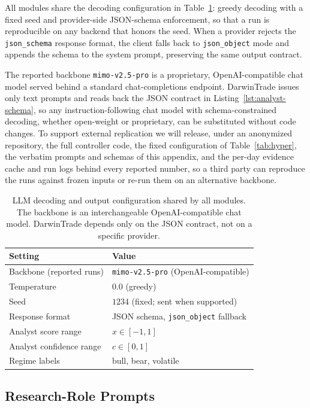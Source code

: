 \documentclass[letterpaper]{article}
\begin{document}
All modules share the decoding configuration in Table~\ref{tab:llm-config}: greedy
decoding with a fixed seed and provider-side JSON-schema enforcement, so that a run
is reproducible on any backend that honors the seed. When a provider rejects the
\texttt{json\_schema} response format, the client falls back to
\texttt{json\_object} mode and appends the schema to the system prompt, preserving
the same output contract.

The reported backbone \texttt{mimo-v2.5-pro} is a proprietary, OpenAI-compatible
chat model served behind a standard chat-completions endpoint. DarwinTrade issues
only text prompts and reads back the JSON contract in
Listing~\ref{lst:analyst-schema}, so any instruction-following chat model with
schema-constrained decoding, whether open-weight or proprietary, can be
substituted without
code changes. To support external replication we will release, under an anonymized
repository, the full controller code, the fixed configuration of
Table~\ref{tab:hyper}, the verbatim prompts and schemas of this appendix, and the
per-day evidence cache and run logs behind every reported number, so a third party
can reproduce the runs against frozen inputs or re-run them on an alternative
backbone.

\begin{table}[tb]
\centering
\footnotesize
\setlength{\tabcolsep}{6pt}
\begin{tabular}{@{}ll@{}}
\toprule
Setting & Value \\
\midrule
Backbone (reported runs) & \texttt{mimo-v2.5-pro} (OpenAI-compatible) \\
Temperature & $0.0$ (greedy) \\
Seed & $1234$ (fixed; sent when supported) \\
Response format & JSON schema, \texttt{json\_object} fallback \\
Analyst score range & $x\in[-1,1]$ \\
Analyst confidence range & $c\in[0,1]$ \\
Regime labels & bull, bear, volatile \\
\bottomrule
\end{tabular}
\caption{LLM decoding and output configuration shared by all modules. The backbone
is an interchangeable OpenAI-compatible chat model. DarwinTrade depends only on the
JSON contract, not on a specific provider.}
\label{tab:llm-config}
\end{table}

\subsection{Research-Role Prompts}
\label{app:analyst-prompts}
\end{document}
